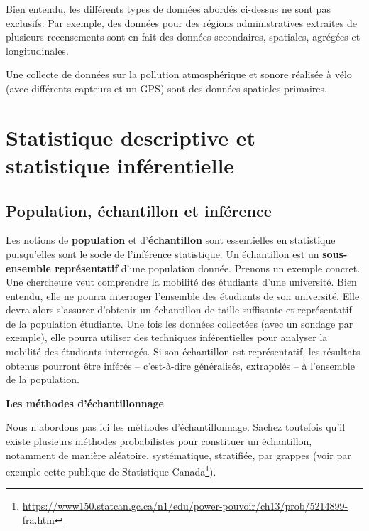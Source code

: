 \documentclass[
  11pt,
  french,
]{book}
\makeatletter
\renewcommand{\href}[2]{#2\footnote{\url{#1}}}
\newenvironment{kframev}{%
\medskip{}
\setlength{\fboxsep}{.8em}
 \def\at@end@of@kframev{}%
 \ifinner\ifhmode%
  \def\at@end@of@kframev{\end{minipage}}%
  \begin{minipage}{\columnwidth}%
 \fi\fi%
 \def\FrameCommand##1{\hskip\@totalleftmargin \hskip-\fboxsep
 \colorbox{shadebluecolor}{##1}\hskip-\fboxsep
     \hskip-\linewidth \hskip-\@totalleftmargin \hskip\columnwidth}%
 \MakeFramed {\advance\hsize-\width
   \@totalleftmargin\z@ \linewidth\hsize
   \@setminipage}}%
 {\par\unskip\endMakeFramed%
 \at@end@of@kframev}
\newenvironment{rmdblock}[1]
  {
  \begin{itemize}
  \renewcommand{\labelitemi}{
    \raisebox{-.7\height}[0pt][0pt]{
      {\setkeys{Gin}{width=3em,keepaspectratio}\texttt{[image: images/\#1]}}
    }
  }
  \setlength{\fboxsep}{1em}
  \begin{kframev}
  \small
  \item
  }
  {
  \end{kframev}
  \end{itemize}
  }
\newenvironment{bloc_notes}
  {\begin{rmdblock}{notes}}
  {\end{rmdblock}}
\newenvironment{bloc_aller_loin}
  {\begin{rmdblock}{aller_loin}}
  {\end{rmdblock}}
\makeatother
\begin{document}
\begin{bloc_notes}
Bien entendu, les différents types de données abordés ci-dessus ne sont pas exclusifs. Par exemple, des données pour des régions administratives extraites de plusieurs recensements sont en fait des données secondaires, spatiales, agrégées et longitudinales.

Une collecte de données sur la pollution atmosphérique et sonore réalisée à vélo (avec différents capteurs et un GPS) sont des données spatiales primaires.

\end{bloc_notes}

\hypertarget{sect023}{%
\section{Statistique descriptive et statistique inférentielle}\label{sect023}}

\hypertarget{sect0231}{%
\subsection{Population, échantillon et inférence}\label{sect0231}}

Les notions de \textbf{population} et d'\textbf{échantillon} sont essentielles en statistique puisqu'elles sont le socle de l'inférence statistique.
Un échantillon est un \textbf{sous-ensemble représentatif} d'une population donnée. Prenons un exemple concret. Une chercheure veut comprendre la mobilité des étudiants d'une université. Bien entendu, elle ne pourra interroger l'ensemble des étudiants de son université. Elle devra alors s'assurer d'obtenir un échantillon de taille suffisante et représentatif de la population étudiante. Une fois les données collectées (avec un sondage par exemple), elle pourra utiliser des techniques inférentielles pour analyser la mobilité des étudiants interrogés. Si son échantillon est représentatif, les résultats obtenus pourront être inférés -- c'est-à-dire généralisés, extrapolés -- à l'ensemble de la population.

\begin{bloc_aller_loin}
\textbf{Les méthodes d'échantillonnage}

Nous n'abordons pas ici les méthodes d'échantillonnage. Sachez toutefois qu'il existe plusieurs méthodes probabilistes pour constituer un échantillon, notamment de manière aléatoire, systématique, stratifiée, par grappes (\href{https://www150.statcan.gc.ca/n1/edu/power-pouvoir/ch13/prob/5214899-fra.htm}{voir par exemple cette publique de Statistique Canada}).

\end{bloc_aller_loin}
\end{document}
